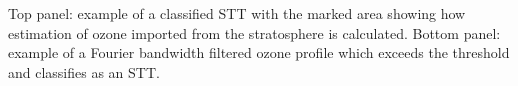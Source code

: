 \label{fig:sttquant}
Top panel: example of a classified STT with the marked area showing how estimation of ozone imported from the stratosphere is calculated.
Bottom panel: example of a Fourier bandwidth filtered ozone profile which exceeds the threshold and classifies as an STT.